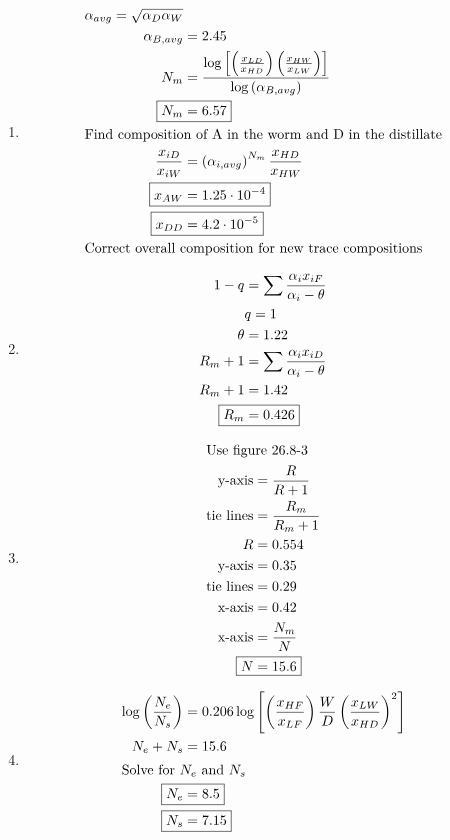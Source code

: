 \begin{enumerate}
    \item 
    \begin{align*}
        \alpha_{avg} = \sqrt{\alpha_D \alpha_W} \\
        \alpha_{B, avg} &= 2.45 \\
        N_m &= \frac{\log\left[\left(\frac{x_{LD}}{x_{HD}}\right)\left(\frac{x_{HW}}{x_{LW}}\right)\right]}{\log\left(\alpha_{B, avg}\right)} \\
        \Aboxed{N_m &= 6.57} \\
        \intertext{Find composition of A in the worm and D in the distillate}
        \frac{x_{iD}}{x_{iW}} &= \left(\alpha_{i,avg}\right)^{N_m} \frac{x_{HD}}{x_{HW}} \\
        \Aboxed{x_{AW} &= 1.25\cdot10^{-4}} \\
        \Aboxed{x_{DD} &= 4.2\cdot10^{-5}} \\
        \intertext{Correct overall composition for new trace compositions}
    \end{align*}

    \item 
    \begin{align*}
        1-q &= \sum \frac{\alpha_ix_{iF}}{\alpha_i-\theta} \\
        & q = 1 \\
        \theta &= 1.22 \\
        R_m + 1 &= \sum \frac{\alpha_ix_{iD}}{\alpha_i-\theta} \\
        R_m + 1 &= 1.42 \\
        \Aboxed{R_m &= 0.426}
    \end{align*}

    \item 
    \begin{align*}
        \intertext{Use figure 26.8-3}
        \text{y-axis} &= \frac{R}{R+1} \\
        \text{tie lines} &= \frac{R_m}{R_m+1} \\
        R &= 0.554 \\
        \text{y-axis} &= 0.35 \\
        \text{tie lines} &= 0.29 \\
        \text{x-axis} &= 0.42 \\
        \text{x-axis} &= \frac{N_m}{N} \\
        \Aboxed{N &= 15.6}
    \end{align*}
    
    \item 
    \begin{align*}
        \log \left(\frac{N_e}{N_s}\right) &= 0.206 \log\left[\left(\frac{x_{HF}}{x_{LF}}\right)\frac{W}{D}\left(\frac{x_{LW}}{x_{HD}}\right)^2\right] \\
        N_e + N_s &= 15.6 \\
        \intertext{Solve for $N_e$ and $N_s$}
        \Aboxed{N_e &= 8.5} \\
        \Aboxed{N_s &= 7.15}
    \end{align*}
\end{enumerate}